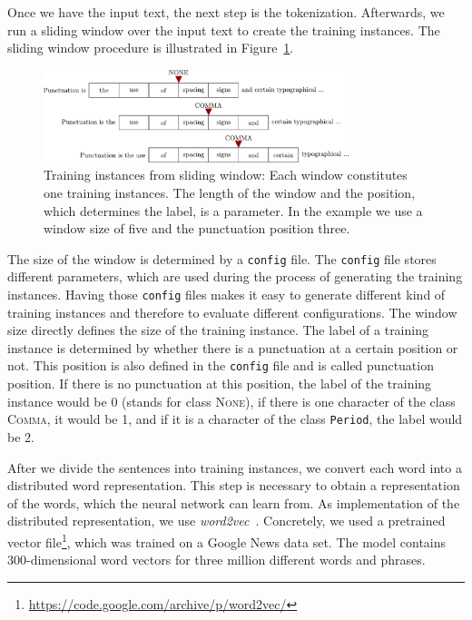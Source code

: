 Once we have the input text, the next step is the tokenization.
Afterwards, we run a sliding window over the input text to create the training instances.
The sliding window procedure is illustrated in Figure~\ref{fig:sliding_window}.
\begin{figure}[ht]
    \centering
    \includegraphics[width=0.8\textwidth]{img/sliding_window.pdf}
    \caption{Training instances from sliding window: Each window constitutes one training instances. The length of the window and the position, which determines the label, is a parameter. In the example we use a window size of five and the punctuation position three.}
    \label{fig:sliding_window}
\end{figure}
The size of the window is determined by a \texttt{config} file.
The \texttt{config} file stores different parameters, which are used during the process of generating the training instances.
Having those \texttt{config} files makes it easy to generate different kind of training instances and therefore to evaluate different configurations.
The window size directly defines the size of the training instance.
The label of a training instance is determined by whether there is a punctuation at a certain position or not.
This position is also defined in the \texttt{config} file and is called punctuation position.
If there is no punctuation at this position, the label of the training instance would be 0 (stands for class \textsc{None}), if there is one character of the class \textsc{Comma}, it would be 1, and if it is a character of the class \texttt{Period}, the label would be 2.

After we divide the sentences into training instances, we convert each word into a distributed word representation.
This step is necessary to obtain a representation of the words, which the neural network can learn from.
As implementation of the distributed representation, we use \emph{word2vec}~\cite{Mikolov1, Mikolov2, Mikolov3}.
Concretely, we used a pretrained vector file\footnote{\url{https://code.google.com/archive/p/word2vec/}}, which was trained on a Google News data set.
The model contains 300-dimensional word vectors for three million different words and phrases.

